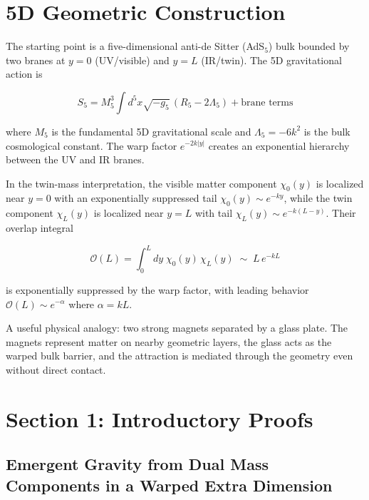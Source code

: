 \documentclass[
  11pt,
]{article}
\begin{document}
\bigskip

\bigskip

\section{5D Geometric Construction}\label{sec:5d-geometric-construction}

The starting point is a five-dimensional anti-de Sitter (AdS\(_5\)) bulk
bounded by two branes at \(y = 0\) (UV/visible) and \(y = L\) (IR/twin).
The 5D gravitational action is

\[S_5 = M_5^3 \int d^5x \sqrt{-g_5}\,(R_5 - 2\Lambda_5) + \text{brane terms} \tag{2}\]

where \(M_5\) is the fundamental 5D gravitational scale and
\(\Lambda_5 = -6k^2\) is the bulk cosmological constant. The warp factor
\(e^{-2k|y|}\) creates an exponential hierarchy between the UV and IR
branes.

In the twin-mass interpretation, the visible matter component
\(\chi_0(y)\) is localized near \(y = 0\) with an exponentially
suppressed tail \(\chi_0(y) \sim e^{-ky}\), while the twin component
\(\chi_L(y)\) is localized near \(y = L\) with tail
\(\chi_L(y) \sim e^{-k(L-y)}\). Their overlap integral

\[\mathcal{O}(L) = \int_0^L dy\;\chi_0(y)\,\chi_L(y) \;\sim\; L\,e^{-kL} \tag{3}\]

is exponentially suppressed by the warp factor, with leading behavior
\(\mathcal{O}(L) \sim e^{-\alpha}\) where \(\alpha = kL\).

A useful physical analogy: two strong magnets separated by a glass
plate. The magnets represent matter on nearby geometric layers, the
glass acts as the warped bulk barrier, and the attraction is mediated
through the geometry even without direct contact.

\bigskip

\bigskip

\hypertarget{section-1-introductory-proofs}{%
\section{Section 1: Introductory
Proofs}\label{section-1-introductory-proofs}}

\hypertarget{emergent-gravity-from-dual-mass-components-in-a-warped-extra-dimension}{%
\subsection{Emergent Gravity from Dual Mass Components in a Warped Extra
Dimension}\label{emergent-gravity-from-dual-mass-components-in-a-warped-extra-dimension}}
\end{document}
